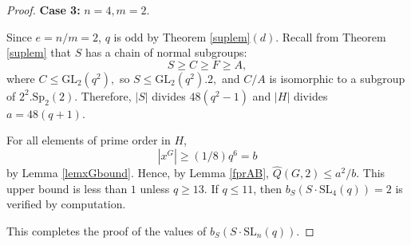 \documentclass[a4paper,reqno,11pt]{amsart}
\theoremstyle{definition}
\theoremstyle{remark}
\numberwithin{equation}{section}
\newcommand{\SL}{{\mathrm{SL}}}
\newcommand{\GL}{{\mathrm{GL}}}
\newcommand{\Sp}{{\mathrm{Sp}}}
\begin{document}
\begin{proof}
\medskip 
 
{\bf Case 3:} $n=4,m=2.$

 Since $e=n/m=2$, $q$ is odd by Theorem \ref{suplem}$(d)$. Recall from Theorem \ref{suplem} that $S$ has a chain of normal subgroups:
$$S \ge C \ge F \ge A,$$
where $C \le \GL_2(q^2),$ so $S \le \GL_2(q^2).2,$ and $C/A$ is isomorphic to a subgroup of $2^2.\Sp_2(2).$ 
Therefore, $|S| $ divides $ 48(q^2-1)$ and $|H|$ divides $a=48(q+1).$ 
 
 For all elements of prime order in $H$,
 $$|x^G| \ge (1/8)q^6=b$$ by Lemma \ref{lemxGbound}. Hence, by Lemma \ref{fprAB},
 $\hat{Q}(G,2) \le  a^2/b$.  This upper bound is less than $1$ unless  $q \ge 13.$
If $q \le 11$, then  $b_S(S \cdot \SL_4(q))=2$  is verified  by computation.

This completes the proof of the values of $b_S(S \cdot \SL_n(q)).$



\medskip





\end{proof}
\end{document}
